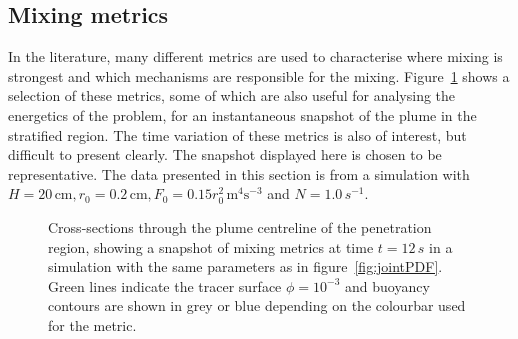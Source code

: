 \documentclass[a4paper]{article}
\begin{document}
\subsection{Mixing metrics}
\label{sec:mixing}

In the literature, many different metrics are used to characterise where mixing is strongest
and which mechanisms are responsible for the mixing. Figure~\ref{fig:mixing} shows a selection of these
metrics, some of which are also useful for analysing the energetics of the problem, for an instantaneous
snapshot of the plume in the stratified region. The time variation of these metrics is also of interest, but
difficult to present clearly. The snapshot displayed here is chosen to be representative. The data presented
in this section is from a simulation with $H = 20\,\mathrm{cm}, r_0 = 0.2 \, \mathrm{cm}, F_0 = 0.15r_0^2 \,
\mathrm{m}^4 \mathrm{s}^{-3}$ and $N = 1.0 \,s^{-1}$.

\begin{figure}
	\centering
	\caption{Cross-sections through the plume centreline of the penetration region, showing a snapshot of
	mixing metrics at time $t = 12 \, s$ in a simulation with the same parameters as in
	figure~\ref{fig:jointPDF}. Green lines indicate the tracer surface $\phi = 10^{-3}$ and buoyancy contours
	are shown in grey or blue depending on the colourbar used for the metric. }
	\label{fig:mixing}
\end{figure}
\end{document}
